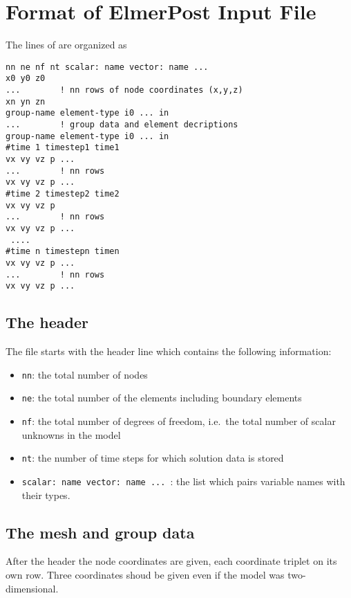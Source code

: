 \chapter{Format of ElmerPost Input File}
\label{chapter-post-format}

The lines of  are organized as

\begin{verbatim}
nn ne nf nt scalar: name vector: name ...
x0 y0 z0
...        ! nn rows of node coordinates (x,y,z)
xn yn zn
group-name element-type i0 ... in
...        ! group data and element decriptions
group-name element-type i0 ... in
#time 1 timestep1 time1
vx vy vz p ...
...        ! nn rows 
vx vy vz p ...
#time 2 timestep2 time2
vx vy vz p
...        ! nn rows 
vx vy vz p ...
 ....
#time n timestepn timen
vx vy vz p ...
...        ! nn rows 
vx vy vz p ...
\end{verbatim}

\section*{The header}
The file starts with the header line which contains the 
following information:
\begin{itemize}
\item {\tt nn}: the total number of nodes
\item {\tt ne}: the total number of the elements including boundary elements
\item {\tt nf}: the total number of degrees of freedom, i.e.\ the total number of
scalar unknowns in the model
\item {\tt nt}: the number of time steps for which solution data is stored
\item {\tt scalar: name vector: name ... }: the list which pairs variable names with
their types.
\end{itemize}

\section*{The mesh and group data}

After the header the node coordinates are given, each coordinate triplet on its own row. 
Three coordinates shoud be given even if the model was two-dimensional.

